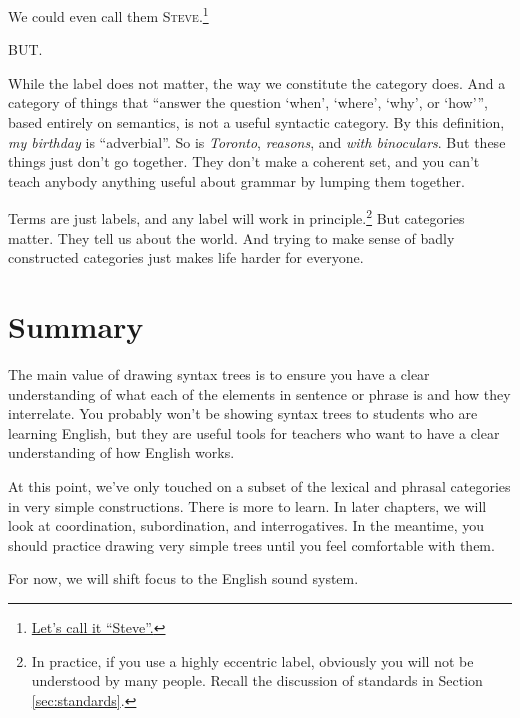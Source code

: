 We could even call them \textsc{Steve}.\footnote{\href{https://www.youtube.com/embed/CiGFRLCC-Ao}{Let's call it ``Steve''.}}

BUT.

While the label does not matter, the way we constitute the category does. And a category of things that ``answer the question `when', `where', `why', or `how''', based entirely on semantics, is not a useful syntactic category. By this definition, \textit{my birthday} is ``adverbial''. So is \textit{Toronto}, \textit{reasons}, and \textit{with binoculars}. But these things just don't go together. They don't make a coherent set, and you can't teach anybody anything useful about grammar by lumping them together.

Terms are just labels, and any label will work in principle.\footnote{In practice, if you use a highly eccentric label, obviously you will not be understood by many people. Recall the discussion of standards in Section \ref{sec:standards}.} But categories matter. They tell us about the world. And trying to make sense of badly constructed categories just makes life harder for everyone.

\section{Summary}
The main value of drawing syntax trees is to ensure you have a clear understanding of what each of the elements in sentence or phrase is and how they interrelate. You probably won't be showing syntax trees to students who are learning English, but they are useful tools for teachers who want to have a clear understanding of how English works.

At this point, we've only touched on a subset of the lexical and phrasal categories in very simple constructions. There is more to learn. In later chapters, we will look at coordination, subordination, and interrogatives. In the meantime, you should practice drawing very simple trees until you feel comfortable with them.

For now, we will shift focus to the English sound system.
